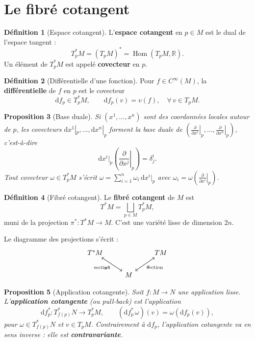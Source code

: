 \documentclass[12pt,a4paper,openany]{book}
\theoremstyle{definition}
\newtheorem{definition}{Définition}[chapter]
\theoremstyle{plain}
\newtheorem{proposition}[definition]{Proposition}
\theoremstyle{remark}
\newcommand{\R}{\mathbb{R}}
\DeclareMathOperator{\Hom}{Hom}
\newcommand{\dd}{\mathrm{d}}
\begin{document}
\section{Le fibré cotangent}\label{sec:fibre-cotangent}

\begin{definition}[Espace cotangent]\label{def:cotangent}
L'\textbf{espace cotangent} en $p \in M$ est le dual de
l'espace tangent :
\[
  T_p^*M = (T_pM)^* = \Hom(T_pM, \R).
\]
Un élément de $T_p^*M$ est appelé \textbf{covecteur} en $p$.
\end{definition}

\begin{definition}[Différentielle d'une fonction]\label{def:diff-fonction}
Pour $f \in C^\infty(M)$, la \textbf{différentielle}
de $f$ en $p$ est le covecteur
\[
  \dd f_p \in T_p^*M, \qquad \dd f_p(v) = v(f), \quad \forall\, v \in T_pM.
\]
\end{definition}

\begin{proposition}[Base duale]\label{prop:base-duale}
Si $(x^1, \ldots, x^n)$ sont des coordonnées locales autour de $p$, les covecteurs
$\dd x^1|_p, \ldots, \dd x^n|_p$ forment la base duale de
$\left(\left.\frac{\partial}{\partial x^1}\right|_p, \ldots,
\left.\frac{\partial}{\partial x^n}\right|_p\right)$, c'est-à-dire
\[
  \dd x^i|_p \!\left(\left.\frac{\partial}{\partial x^j}\right|_p\right) = \delta^i_j.
\]
Tout covecteur $\omega \in T_p^*M$ s'écrit $\omega = \sum_{i=1}^n \omega_i\, \dd x^i|_p$
avec $\omega_i = \omega\!\left(\left.\frac{\partial}{\partial x^i}\right|_p\right)$.
\end{proposition}

\begin{definition}[Fibré cotangent]\label{def:fibre-cotangent}
Le \textbf{fibré cotangent} de $M$ est
\[
  T^*M = \bigsqcup_{p \in M} T_p^*M,
\]
muni de la projection $\pi^* : T^*M \to M$. C'est une variété lisse de dimension $2n$.
\end{definition}

Le diagramme des projections s'écrit :
\[
\begin{tikzcd}
  T^*M \arrow[dr, "\pi^*"'] & & TM \arrow[dl, "\pi"] \\
  & M \arrow[ul, "\text{section}"] \arrow[ur, "\text{section}"'] &
\end{tikzcd}
\]

\begin{proposition}[Application cotangente]\label{prop:application-cotangente}
Soit $f : M \to N$ une application lisse. L'\textbf{application cotangente}
(ou \emph{pull-back}) est l'application
\[
  \dd f_p^* : T_{f(p)}^*N \longrightarrow T_p^*M, \qquad
  (\dd f_p^*\,\omega)(v) = \omega(\dd f_p(v)),
\]
pour $\omega \in T_{f(p)}^*N$ et $v \in T_pM$.
Contrairement à $\dd f_p$, l'application cotangente va en sens
\emph{inverse} : elle est \textbf{contravariante}.
\end{proposition}
\end{document}
